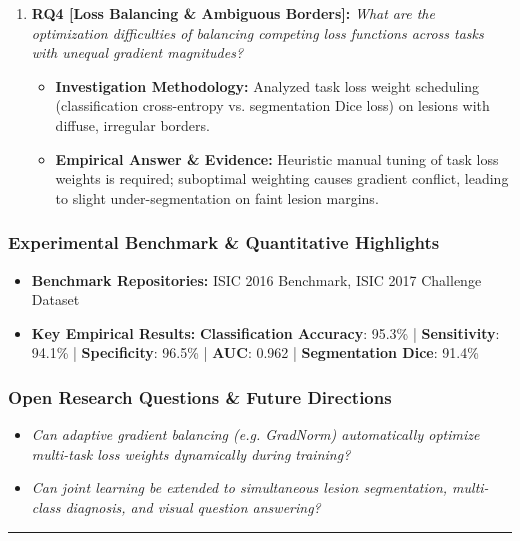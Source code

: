 \begin{enumerate}[label=\textbf{\arabic*.}, leftmargin=*]
\begin{itemize}[leftmargin=1.5em]
  \end{itemize}
  \item \textbf{RQ4 [Loss Balancing \& Ambiguous Borders]:} \textit{What are the optimization difficulties of balancing competing loss functions across tasks with unequal gradient magnitudes?}
  \begin{itemize}[leftmargin=1.5em]
    \item \textbf{Investigation Methodology:} Analyzed task loss weight scheduling (classification cross-entropy vs. segmentation Dice loss) on lesions with diffuse, irregular borders.
    \item \textbf{Empirical Answer \& Evidence:} Heuristic manual tuning of task loss weights is required; suboptimal weighting causes gradient conflict, leading to slight under-segmentation on faint lesion margins.
  \end{itemize}
\end{enumerate}

\subsubsection*{Experimental Benchmark \& Quantitative Highlights}
\begin{itemize}[leftmargin=*]
  \item \textbf{Benchmark Repositories:} ISIC 2016 Benchmark, ISIC 2017 Challenge Dataset
  \item \textbf{Key Empirical Results:} \textbf{Classification Accuracy}: 95.3\% \quad | \quad \textbf{Sensitivity}: 94.1\% \quad | \quad \textbf{Specificity}: 96.5\% \quad | \quad \textbf{AUC}: 0.962 \quad | \quad \textbf{Segmentation Dice}: 91.4\%
\end{itemize}

\subsubsection*{Open Research Questions \& Future Directions}
\begin{itemize}[leftmargin=*]
  \item \textit{Can adaptive gradient balancing (e.g. GradNorm) automatically optimize multi-task loss weights dynamically during training?}
  \item \textit{Can joint learning be extended to simultaneous lesion segmentation, multi-class diagnosis, and visual question answering?}
\end{itemize}
\vspace{0.8em}\hrule\vspace{1.2em}

